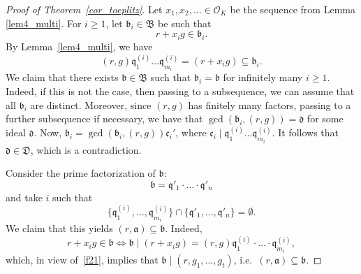\documentclass[leqno,a4paper,12pt]{article}
\DeclareMathOperator{\lcm}{lcm}
\theoremstyle{definition}
\newcommand{\divides}{\mid}
\newcommand{\OK}{\mathcal{O}_K}
\begin{document}
\begin{proof}[Proof of Theorem~\ref{cor_toeplitz}]
Let $x_1,x_2,\ldots\in\OK$ be the sequence from Lemma \ref{lem4_multi}. For $i\geq1$, let $\mathfrak{b}_i\in\mathfrak{B}$ be such that
\[
r+x_ig\in\mathfrak{b}_i.
\]
By Lemma~\ref{lem4_multi}, we have \[(r,g)\mathfrak{q}_1^{(i)}\ldots\mathfrak{q}_{m_i}^{(i)}=(r+x_ig)\subseteq\mathfrak{b}_i.\] We claim that there exists $\mathfrak{b}\in\mathfrak{B}$ such that $\mathfrak{b}_i=\mathfrak{b}$ for infinitely many $i\geq1$. Indeed, if this is not the case, then passing to a subsequence, we can assume that all $\mathfrak{b}_i$ are distinct. Moreover, since $(r,g)$ has finitely many factors, passing to a further subsequence if necessary, we have that $\gcd(\mathfrak{b}_i,(r,g))=\mathfrak{d}$ for some ideal $\mathfrak{d}$. Now, $\mathfrak{b}_i=\gcd(\mathfrak{b}_i,(r,g))\mathfrak{c}_i'$, where $\mathfrak{c}_i\divides \mathfrak{q}_1^{(i)}\ldots\mathfrak{q}_{m_i}^{(i)}$. It follows that $\mathfrak{d}\in\mathfrak{D}$, which is a contradiction.

Consider the prime factorization of $\mathfrak{b}$:
\[
\mathfrak{b}=\mathfrak{q}'_1\cdot\ldots\cdot\mathfrak{q}'_n
\]
and take $i$ such that
\begin{equation}\label{f21}
\{\mathfrak{q}^{(i)}_1,\dots,\mathfrak{q}^{(i)}_{m_i}\}\cap \{\mathfrak{q}'_1,\dots,\mathfrak{q}'_n\}=\emptyset.
\end{equation}
We claim that this yields $(r,\mathfrak{a})\subseteq \mathfrak{b}$. Indeed,
\[
r+x_{i}g\in\mathfrak{b} \iff \mathfrak{b} \divides (r+x_{i}g)=(r,g)\mathfrak{q}_1^{(i)}\cdot\ldots\cdot \mathfrak{q}_{m_i}^{(i)},
\]
which, in view of~\eqref{f21}, implies that $\mathfrak{b}\divides (r,g_1,\dots,g_t)$, i.e.\ $(r,\mathfrak{a})\subseteq \mathfrak{b}$.
%
%
%
\end{proof}
\end{document}
